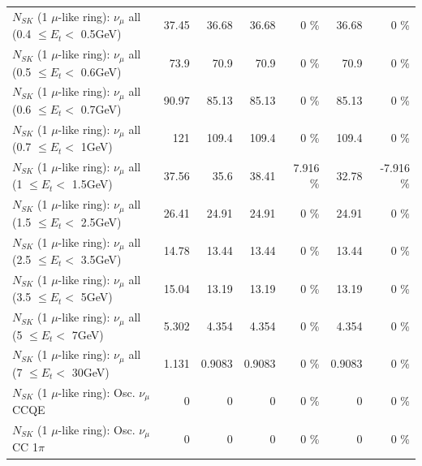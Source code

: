 \begin{table}
\begin{tabular}{| l | r | r | r  r | r  r |}
       $N_{SK}$ (1 $\mu$-like ring): $\nu_{\mu}$ all (0.4 $\leq E_{t} <$ 0.5GeV) &           37.45 &           36.68 &           36.68 &        0 \%  &           36.68 &        0 \%  \\ 
       $N_{SK}$ (1 $\mu$-like ring): $\nu_{\mu}$ all (0.5 $\leq E_{t} <$ 0.6GeV) &            73.9 &            70.9 &            70.9 &        0 \%  &            70.9 &        0 \%  \\ 
       $N_{SK}$ (1 $\mu$-like ring): $\nu_{\mu}$ all (0.6 $\leq E_{t} <$ 0.7GeV) &           90.97 &           85.13 &           85.13 &        0 \%  &           85.13 &        0 \%  \\ 
         $N_{SK}$ (1 $\mu$-like ring): $\nu_{\mu}$ all (0.7 $\leq E_{t} <$ 1GeV) &             121 &           109.4 &           109.4 &        0 \%  &           109.4 &        0 \%  \\ 
         $N_{SK}$ (1 $\mu$-like ring): $\nu_{\mu}$ all (1 $\leq E_{t} <$ 1.5GeV) &           37.56 &            35.6 &           38.41 &    7.916 \%  &           32.78 &   -7.916 \%  \\ 
       $N_{SK}$ (1 $\mu$-like ring): $\nu_{\mu}$ all (1.5 $\leq E_{t} <$ 2.5GeV) &           26.41 &           24.91 &           24.91 &        0 \%  &           24.91 &        0 \%  \\ 
       $N_{SK}$ (1 $\mu$-like ring): $\nu_{\mu}$ all (2.5 $\leq E_{t} <$ 3.5GeV) &           14.78 &           13.44 &           13.44 &        0 \%  &           13.44 &        0 \%  \\ 
         $N_{SK}$ (1 $\mu$-like ring): $\nu_{\mu}$ all (3.5 $\leq E_{t} <$ 5GeV) &           15.04 &           13.19 &           13.19 &        0 \%  &           13.19 &        0 \%  \\ 
           $N_{SK}$ (1 $\mu$-like ring): $\nu_{\mu}$ all (5 $\leq E_{t} <$ 7GeV) &           5.302 &           4.354 &           4.354 &        0 \%  &           4.354 &        0 \%  \\ 
          $N_{SK}$ (1 $\mu$-like ring): $\nu_{\mu}$ all (7 $\leq E_{t} <$ 30GeV) &           1.131 &          0.9083 &          0.9083 &        0 \%  &          0.9083 &        0 \%  \\ 
\hline
\hline
                               $N_{SK}$ (1 $\mu$-like ring): Osc. $\nu_\mu$ CCQE &               0 &               0 &               0 &        0 \%  &               0 &        0 \%  \\ 
                          $N_{SK}$ (1 $\mu$-like ring): Osc. $\nu_\mu$ CC 1$\pi$ &               0 &               0 &               0 &        0 \%  &               0 &        0 \%  \\ 

\end{tabular}
\end{table}
